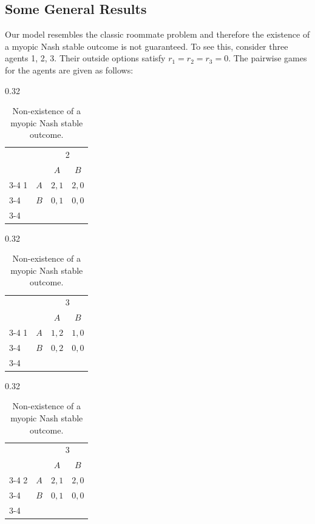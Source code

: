 \documentclass{myPaper}
\begin{document}
\subsection{Some General Results}
Our model resembles the classic roommate problem and therefore the existence of a myopic Nash stable outcome is not guaranteed. To see this, consider three agents 1, 2, 3. Their outside options satisfy $r_1=r_2=r_3=0$. The pairwise games for the agents are given as follows:
\begin{table}[!ht]
\centering

\begin{subtable}{0.32\textwidth}
\centering
\begin{tabular}
[c]{llrc}
&  & \multicolumn{2}{c}{2} \\
&  & \multicolumn{1}{c}{$A$} & $B$ \\\cline{3-4}%
1 & $A$ & \multicolumn{1}{|l}{$2,1$} & \multicolumn{1}{|l|}{$2, 0$%
}\\\cline{3-4}
& $B$ & \multicolumn{1}{|l}{$0, 1$} & \multicolumn{1}{|l|}{$0, 0$}\\\cline{3-4}%
\end{tabular}
\caption{$\Gamma_{12}$ ($\Gamma_{21}$).}
\end{subtable}
\hfill
\begin{subtable}{0.32\textwidth}
\centering
\begin{tabular}
[c]{llrc}
&  & \multicolumn{2}{c}{3} \\
&  & \multicolumn{1}{c}{$A$} & $B$ \\\cline{3-4}%
1 & $A$ & \multicolumn{1}{|l}{$1,2$} & \multicolumn{1}{|l|}{$1, 0$%
}\\\cline{3-4}
& $B$ & \multicolumn{1}{|l}{$0, 2$} & \multicolumn{1}{|l|}{$0, 0$}\\\cline{3-4}%
\end{tabular}
\caption{$\Gamma_{13}$ ($\Gamma_{31}$).}
\end{subtable}
\hfill
\begin{subtable}{0.32\textwidth}
\centering
\begin{tabular}
[c]{llrc}
&  & \multicolumn{2}{c}{3} \\
&  & \multicolumn{1}{c}{$A$} & $B$ \\\cline{3-4}%
2 & $A$ & \multicolumn{1}{|l}{$2,1$} & \multicolumn{1}{|l|}{$2, 0$%
}\\\cline{3-4}
& $B$ & \multicolumn{1}{|l}{$0, 1$} & \multicolumn{1}{|l|}{$0, 0$}\\\cline{3-4}%
\end{tabular}
\caption{$\Gamma_{23}$ ($\Gamma_{32}$).}
\end{subtable}

\caption{Non-existence of a myopic Nash stable outcome.}
\end{table}
\end{document}
